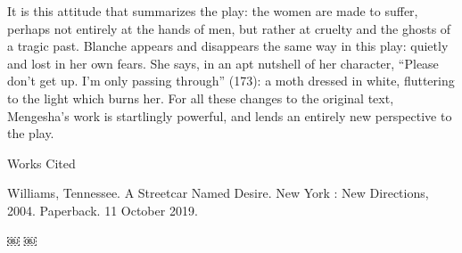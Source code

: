 \documentclass{article}
\begin{document}
\qquad It is this attitude that summarizes the play: the women are made to suffer, perhaps not entirely at the hands of men, but rather at cruelty and the ghosts of a tragic past. Blanche appears and disappears the same way in this play: quietly and lost in her own fears. She says, in an apt nutshell of her character, ``Please don’t get up. I’m only passing through” (173): a moth dressed in white, fluttering to the light which burns her. For all these changes to the original text, Mengesha’s work is startlingly powerful, and lends an entirely new perspective to the play. \\
\newpage
\begin{center} Works Cited \\ \end{center}

\flushleft Williams, Tennessee. A Streetcar Named Desire. New York : New Directions, 2004. Paperback. 11 October 2019. 



￼ 
￼ 
\end{document}
